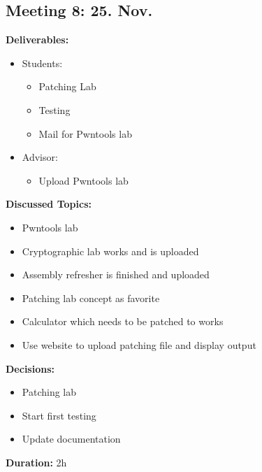 \subsection*{Meeting 8: 25. Nov.}
\textbf{Deliverables:}
\begin{itemize}
    \item Students:
    \begin{itemize}
        \item Patching Lab
        \item Testing
        \item Mail for Pwntools lab
    \end{itemize}
    \item Advisor:
    \begin{itemize}
        \item Upload Pwntools lab
    \end{itemize}
\end{itemize} 
\textbf{Discussed Topics:}
\begin{itemize}
    \item Pwntools lab
    \item Cryptographic lab works and is uploaded
    \item Assembly refresher is finished and uploaded
    \item Patching lab concept as favorite
    \item Calculator which needs to be patched to works
    \item Use website to upload patching file and display output
\end{itemize}
\textbf{Decisions:}
\begin{itemize}
    \item Patching lab 
    \item Start first testing
    \item Update documentation
\end{itemize}
\textbf{Duration:} 2h
